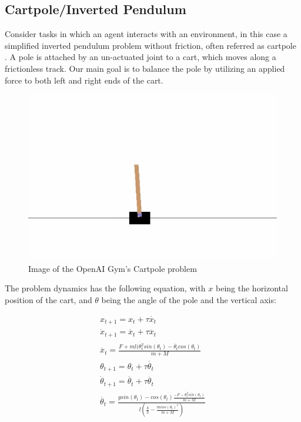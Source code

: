 	\subsection{Cartpole/Inverted Pendulum}
    	   
    Consider tasks in which an agent interacts with an environment,
    in this case a simplified inverted pendulum problem without friction, often referred as cartpole \cite{bartosutton}.  A pole is attached by an un-actuated joint to a cart, which moves along a frictionless track. Our main goal is to balance the pole by utilizing an applied force to both left and right ends of the cart.
    
    \begin{figure}[H]
        \centering
        \includegraphics[scale=0.5]{images/cartpole.png}
        \caption{Image of the OpenAI Gym's Cartpole problem}
        \label{fig:51}
    \end{figure}
    
    The problem dynamics has the following equation, with $x$ being the horizontal position of the cart, and $\theta$ being the angle of the pole and the vertical axis:
    
        \begin{gather*}
                 x_{t+1}=x_t+\tau \dot{x_t}\\
            \dot{x}_{t+1}=\dot{x_t}+\tau \ddot{x_{t}}\\
            \ddot{x_t}=\frac{F+ml(\dot{\theta_t^2} sin(\theta_t) - \ddot{\theta_t}cos(\theta_t)}{m+M}\\
             \theta_{t+1}=\theta_t+\tau \dot{\theta_t}\\
            \dot{\theta}_{t+1}=\dot{\theta_t}+\tau \ddot{\theta_{t}}\\
            \ddot{\theta_t}=\frac{g sin(\theta_t) - cos(\theta_t)\frac{-F-\dot{\theta_t^2}sin(\theta_t) }{m+M}}{l(\frac{4}{3}-\frac{m cos(\theta_t)^2}{m+M})}\\
        \end{gather*}
       
